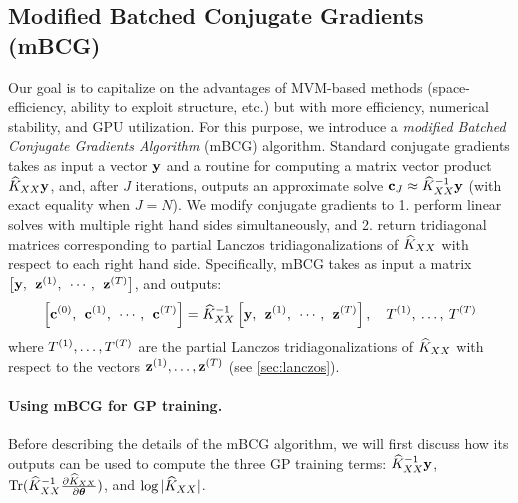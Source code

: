 \subsection{Modified Batched Conjugate Gradients (mBCG)}
\label{sec:mbcg}

Our goal is to capitalize on the advantages of MVM-based methods (space-efficiency, ability to exploit structure, etc.) but with more efficiency, numerical stability, and GPU utilization.
For this purpose, we introduce a \emph{modified Batched Conjugate Gradients Algorithm} (mBCG) algorithm.
Standard conjugate gradients takes as input a vector $\mathbf{y}$ and a routine for computing a matrix vector product $\widehat{K}_{XX}\mathbf{y}$, and, after $J$ iterations, outputs an approximate solve $\mathbf{c}_{J} \approx \widehat{K}_{XX}^{-1}\mathbf{y}$ (with exact equality when $J = N$).
We modify conjugate gradients to 1. perform linear solves with multiple right hand sides simultaneously, and 2. return tridiagonal matrices corresponding to partial Lanczos tridiagonalizations of $\widehat{K}_{XX}$ with respect to each right hand side.
Specifically, mBCG takes as input a matrix $\left[ \mathbf{y}, \:\: \mathbf{z}^{(1)}, \:\: \cdots, \:\: \mathbf{z}^{(T)} \right]$, and outputs:
\begin{equation}
  \label{eqn:mod_cg_call}
  \left[ \mathbf{c}^{(0)}, \:\: \mathbf{c}^{(1)}, \:\: \cdots, \:\: \mathbf{c}^{(T)} \right] = \widehat{K}_{XX}^{-1} \left[ \mathbf{y}, \:\: \mathbf{z}^{(1)}, \:\: \cdots, \:\: \mathbf{z}^{(T)} \right], \quad T^{(1)}, \: \ldots, \: T^{(T)}
\end{equation}
where $T^{(1)}, \ldots, T^{(T)}$ are the partial Lanczos tridiagonalizations of $\widehat{K}_{XX}$ with respect to the vectors $\mathbf{z}^{(1)}, \ldots, \mathbf{z}^{(T)}$ (see \cref{sec:lanczos}).

\paragraph{Using mBCG for GP training.}
Before describing the details of the mBCG algorithm, we will first discuss how its outputs can be used to compute the three GP training terms:
$\widehat{K}_{XX}^{-1} \mathbf{y}$, $\tr{ \trainK^{-1} \frac{\partial \trainK}{\partial \btheta} }$, and $\log \vert \widehat{K}_{XX} \vert$.


